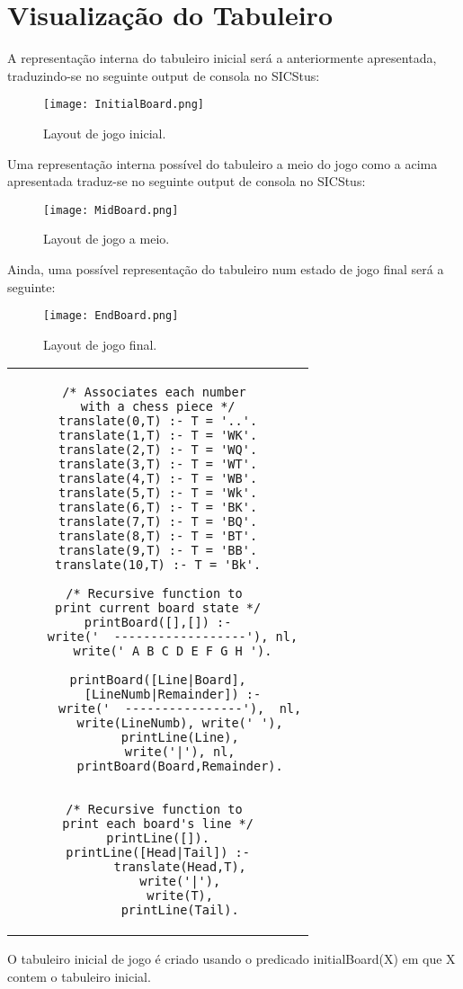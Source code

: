 \documentclass[12pt]{article}
\begin{document}
\section{Visualização do Tabuleiro}

A representação interna do tabuleiro inicial será a anteriormente apresentada, traduzindo-se no seguinte output de consola
no SICStus:
 \begin{figure}[H]
\centering
	\texttt{[image: InitialBoard.png]}
	\caption{Layout de jogo inicial.}
\end{figure}	

Uma representação interna possível do tabuleiro a meio do jogo como a acima apresentada  traduz-se no seguinte output de consola
no SICStus:
 \begin{figure}[H]
\centering
	\texttt{[image: MidBoard.png]}
	\caption{Layout de jogo a meio.}
\end{figure}	

Ainda, uma possível representação do tabuleiro num estado de jogo final será a seguinte: 
 \begin{figure}[H]
\centering
	\texttt{[image: EndBoard.png]}
	\caption{Layout de jogo final.}
\end{figure}	
\begin{center}
\begin{tabular}{c}
\begin{lstlisting}
/* Associates each number 
with a chess piece */
translate(0,T) :- T = '..'.
translate(1,T) :- T = 'WK'.
translate(2,T) :- T = 'WQ'.
translate(3,T) :- T = 'WT'.
translate(4,T) :- T = 'WB'.
translate(5,T) :- T = 'Wk'.
translate(6,T) :- T = 'BK'.
translate(7,T) :- T = 'BQ'.
translate(8,T) :- T = 'BT'.
translate(9,T) :- T = 'BB'.
translate(10,T) :- T = 'Bk'.

/* Recursive function to 
print current board state */
printBoard([],[]) :-
    write('  ------------------'), nl,
    write(' A B C D E F G H ').

printBoard([Line|Board],
	[LineNumb|Remainder]) :-
      write('  ----------------'),  nl,
      write(LineNumb), write(' '),
      printLine(Line),
      write('|'), nl,
      printBoard(Board,Remainder).


/* Recursive function to 
print each board's line */
printLine([]).
printLine([Head|Tail]) :-
      translate(Head,T),
      write('|'),
      write(T),
      printLine(Tail).

\end{lstlisting}
\end{tabular}
\end{center}
O tabuleiro inicial de jogo é criado usando o predicado initialBoard(X) em que X contem o tabuleiro inicial.
\end{document}
